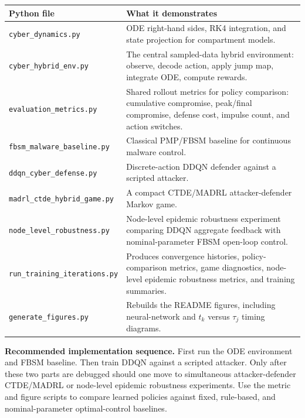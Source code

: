 \documentclass[11pt,a4paper]{article}
\begin{document}
\begin{longtable}{p{}p{}}
\toprule
Python file & What it demonstrates \\
\midrule
{\footnotesize\texttt{cyber\_dynamics.py}} & ODE right-hand sides, RK4 integration, and state projection for compartment models. \\
{\footnotesize\texttt{cyber\_hybrid\_env.py}} & The central sampled-data hybrid environment: observe, decode action, apply jump map, integrate ODE, compute rewards. \\
{\footnotesize\texttt{evaluation\_metrics.py}} & Shared rollout metrics for policy comparison: cumulative compromise, peak/final compromise, defense cost, impulse count, and action switches. \\
{\footnotesize\texttt{fbsm\_malware\_baseline.py}} & Classical PMP/FBSM baseline for continuous malware control. \\
{\footnotesize\texttt{ddqn\_cyber\_defense.py}} & Discrete-action DDQN defender against a scripted attacker. \\
{\footnotesize\texttt{madrl\_ctde\_hybrid\_game.py}} & A compact CTDE/MADRL attacker-defender Markov game. \\
{\footnotesize\texttt{node\_level\_robustness.py}} & Node-level epidemic robustness experiment comparing DDQN aggregate feedback with nominal-parameter FBSM open-loop control. \\
{\footnotesize\texttt{run\_training\_iterations.py}} & Produces convergence histories, policy-comparison metrics, game diagnostics, node-level epidemic robustness metrics, and training summaries. \\
{\footnotesize\texttt{generate\_figures.py}} & Rebuilds the README figures, including neural-network and $t_k$ versus $\tau_j$ timing diagrams. \\
\bottomrule
\end{longtable}

\begin{boxednote}
\textbf{Recommended implementation sequence.}
First run the ODE environment and FBSM baseline. Then train DDQN against a scripted attacker. Only after these two parts are debugged should one move to simultaneous attacker-defender CTDE/MADRL or node-level epidemic robustness experiments. Use the metric and figure scripts to compare learned policies against fixed, rule-based, and nominal-parameter optimal-control baselines.
\end{boxednote}

\appendix
\end{document}
